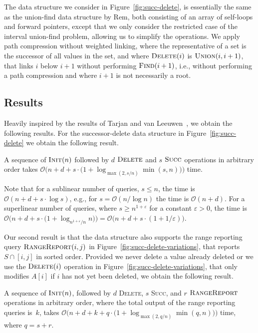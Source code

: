 \documentclass[a4paper]{lipics-v2021}
\let\epsilon\varepsilon
\newcommand{\Oh}{\mathcal{O}}
\newcommand{\FuncName}[1]{\textup{\textsc{#1}}}
\newcommand{\Init}{\FuncName{Init}}
\newcommand{\Delete}{\FuncName{Delete}}
\newcommand{\Succ}{\FuncName{Succ}}
\newcommand{\RangeReport}{\FuncName{RangeReport}}
\newcommand{\Union}{\FuncName{Union}}
\newcommand{\Find}{\FuncName{Find}}
\begin{document}
The data structure we consider in Figure~\ref{fig:succ-delete}, is essentially the same as the union-find data structure by Rem, both consisting of an array of self-loops and forward pointers, except that we only consider the restricted case of the interval union-find problem, allowing us to simplify the operations. We apply path compression without weighted linking, where the representative of a set is the successor of all values in the set, and where $\Delete(i)$ is $\Union(i, i+1)$, that links $i$ below $i+1$ without performing $\Find(i+1)$, i.e., without performing a path compression and where $i+1$ is not necessarily a root.

\subsection{Results}

Heavily inspired by the results of Tarjan and van Leeuwen~\cite{TarjanLeeuwen84}, we obtain the following results. For the successor-delete data structure in Figure~\ref{fig:succ-delete} we obtain the following result.

\begin{theorem}
  \label{thm:succ-delete}
  A sequence of $\Init(n)$ followed by $d$ $\Delete$ and $s$ $\Succ$ operations in arbitrary order takes $\Oh\big(n+d+s\cdot \big(1+\log_{\max(2,s/n)} \min(s,n)\big)\big)$ time.
\end{theorem}

Note that for a sublinear number of queries, $s \leq n$, the time is $\Oh(n+d+s\cdot\log s)$, e.g., for $s=\Oh(n/\log n)$ the time is $\Oh(n+d)$. For a superlinear number of queries, where $s\geq n^{1+\epsilon}$ for a constant $\epsilon > 0$, the time is
$\Oh\big(n+d+s\cdot \big(1+\log_{n^{1+\epsilon} / n} n\big)\big) = \Oh\big(n+d+s\cdot (1+1 / \epsilon)\big)$.

Our second result is that the data structure also supports the range reporting query $\RangeReport(i, j)$ in Figure~\ref{fig:succ-delete-variations}, that reports $S\cap[i,j]$ in sorted order. Provided we never delete a value already deleted or we use the $\Delete(i)$ operation in Figure~\ref{fig:succ-delete-variations}, that only modifies $A[i]$ if $i$ has not yet been deleted, we obtain the following result.

\begin{theorem}
  \label{thm:range-report}
  A sequence of $\Init(n)$, followed by $d$ \Delete, $s$ \Succ, and $r$ $\RangeReport$ operations in arbitrary order, where the total output of the range reporting queries is~$k$, takes $\Oh\big(n+d+k+q \cdot \big(1+\log_{\max(2,q/n)} \min(q,n)\big)\big)$ time, where $q=s+r$.
\end{theorem}
\end{document}
